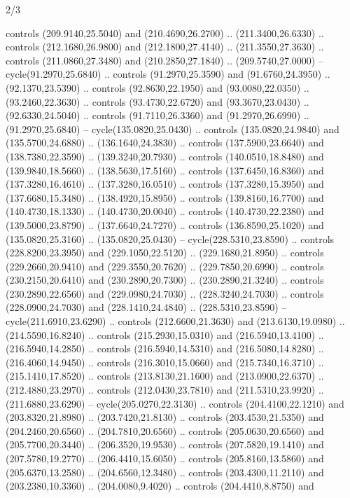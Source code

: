 \begin{flagdescription}{2/3}
\begin{scope}[xshift=0.5\flaglength,yshift=0.5\flagwidth,scale=\stretchfactor]
\begin{scope}[scale=0.001645\flagwidth,yshift=65mm,xshift=-63mm]
\begin{scope}[y=0.80pt, x=0.80pt, yscale=-1,]
\begin{scope}[cm={{1.33333,0.0,0.0,1.33333,(0.0,1e-05)}}]
  controls (209.9140,25.5040) and (210.4690,26.2700) .. (211.3400,26.6330) ..
  controls (212.1680,26.9800) and (212.1800,27.4140) .. (211.3550,27.3630) ..
  controls (211.0860,27.3480) and (210.2850,27.1840) .. (209.5740,27.0000) --
  cycle(91.2970,25.6840) .. controls (91.2970,25.3590) and (91.6760,24.3950) ..
  (92.1370,23.5390) .. controls (92.8630,22.1950) and (93.0080,22.0350) ..
  (93.2460,22.3630) .. controls (93.4730,22.6720) and (93.3670,23.0430) ..
  (92.6330,24.5040) .. controls (91.7110,26.3360) and (91.2970,26.6990) ..
  (91.2970,25.6840) -- cycle(135.0820,25.0430) .. controls (135.0820,24.9840)
  and (135.5700,24.6880) .. (136.1640,24.3830) .. controls (137.5900,23.6640)
  and (138.7380,22.3590) .. (139.3240,20.7930) .. controls (140.0510,18.8480)
  and (139.9840,18.5660) .. (138.5630,17.5160) .. controls (137.6450,16.8360)
  and (137.3280,16.4610) .. (137.3280,16.0510) .. controls (137.3280,15.3950)
  and (137.6680,15.3480) .. (138.4920,15.8950) .. controls (139.8160,16.7700)
  and (140.4730,18.1330) .. (140.4730,20.0040) .. controls (140.4730,22.2380)
  and (139.5000,23.8790) .. (137.6640,24.7270) .. controls (136.8590,25.1020)
  and (135.0820,25.3160) .. (135.0820,25.0430) -- cycle(228.5310,23.8590) ..
  controls (228.8200,23.3950) and (229.1050,22.5120) .. (229.1680,21.8950) ..
  controls (229.2660,20.9410) and (229.3550,20.7620) .. (229.7850,20.6990) ..
  controls (230.2150,20.6410) and (230.2890,20.7300) .. (230.2890,21.3240) ..
  controls (230.2890,22.6560) and (229.0980,24.7030) .. (228.3240,24.7030) ..
  controls (228.0900,24.7030) and (228.1410,24.4840) .. (228.5310,23.8590) --
  cycle(211.6910,23.6290) .. controls (212.6600,21.3630) and (213.6130,19.0980)
  .. (214.5590,16.8240) .. controls (215.2930,15.0310) and (216.5940,13.4100) ..
  (216.5940,14.2850) .. controls (216.5940,14.5310) and (216.5080,14.8280) ..
  (216.4060,14.9450) .. controls (216.3010,15.0660) and (215.7340,16.3710) ..
  (215.1410,17.8520) .. controls (213.8130,21.1600) and (213.0900,22.6370) ..
  (212.4880,23.2970) .. controls (212.0430,23.7810) and (211.5310,23.9920) ..
  (211.6880,23.6290) -- cycle(205.0270,22.3130) .. controls (204.4100,22.1210)
  and (203.8320,21.8980) .. (203.7420,21.8130) .. controls (203.4530,21.5350)
  and (204.2460,20.6560) .. (204.7810,20.6560) .. controls (205.0630,20.6560)
  and (205.7700,20.3440) .. (206.3520,19.9530) .. controls (207.5820,19.1410)
  and (207.5780,19.2770) .. (206.4410,15.6050) .. controls (205.8160,13.5860)
  and (205.6370,13.2580) .. (204.6560,12.3480) .. controls (203.4300,11.2110)
  and (203.2380,10.3360) .. (204.0080,9.4020) .. controls (204.4410,8.8750) and

\end{scope}
\end{scope}
\end{scope}
\end{scope}
\end{flagdescription}
